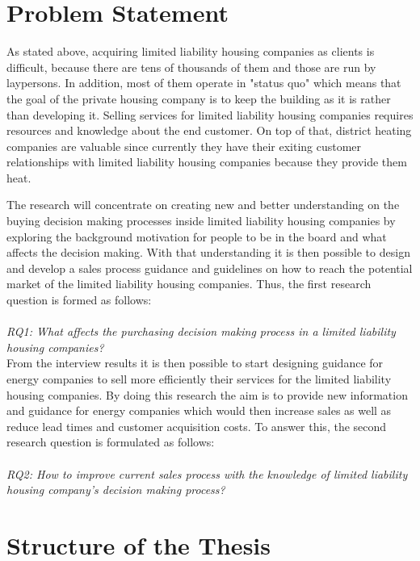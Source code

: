\section{Problem Statement}

As stated above, acquiring limited liability housing companies as clients is difficult, because there are tens of thousands of them and those are run by laypersons. In addition, most of them operate in "status quo" which means that the goal of the private housing company is to keep the building as it is rather than developing it. Selling services for limited liability housing companies requires resources and knowledge about the end customer. On top of that, district heating companies are valuable since currently they have their exiting customer relationships with limited liability housing companies because they provide them heat.

The research will concentrate on creating new and better understanding on the buying decision making processes inside limited liability housing companies by exploring the background motivation for people to be in the board and what affects the decision making. With that understanding it is then possible to design and develop a sales process guidance and guidelines on how to reach the potential market of the limited liability housing companies. Thus, the first research question is formed as follows:\\\\
\emph{RQ1: What affects the purchasing decision making process in a limited liability housing companies?}\\

From the interview results it is then possible to start designing guidance for energy companies to sell more efficiently their services for the limited liability housing companies. By doing this research the aim is to provide new information and guidance for energy companies which would then increase sales as well as reduce lead times and customer acquisition costs. To answer this, the second research question is formulated as follows:\\\\
\emph{RQ2: How to improve current sales process with the knowledge of limited liability housing company's decision making process?}\\

\section{Structure of the Thesis}
\label{section:structure} 

